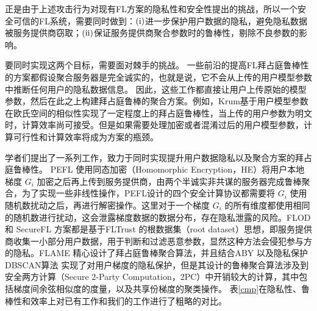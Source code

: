 正是由于上述攻击行为对现有FL方案的隐私性和安全性提出的挑战，所以一个安全可信的FL系统，需要同时做到：$(\rm \romannumeral1)$进一步保护用户数据的隐私，避免隐私数据被服务提供商窃取；$(\rm \romannumeral2)$保证服务提供商聚合参数时的鲁棒性，剔除不良参数的影响。

要同时实现这两个目标，需要面对棘手的挑战。
一些前沿的提高FL拜占庭鲁棒性的方案\cite{blanchard2017machine, guerraoui2018hidden, yin2018byzantine}都假设聚合服务器是完全诚实的，也就是说，它不会从上传的用户模型参数中推断任何用户的隐私数据信息。
因此，这些工作都直接让用户上传原始的模型参数，然后在此之上构建拜占庭鲁棒的聚合方案。例如，Krum\cite{blanchard2017machine}基于用户模型参数在欧氏空间的相似性实现了一定程度上的拜占庭鲁棒性，当上传的用户参数为明文时，计算效率尚可接受。但是如果需要处理加密或者混淆过后的用户模型参数，计算可行性和计算效率将成为方案的瓶颈。

学者们提出了一系列工作\cite{liu2021privacy, dong2021flod, nguyen2022flame, hao2021efficient, so2020byzantine}，致力于同时实现提升用户数据隐私以及聚合方案的拜占庭鲁棒性。
PEFL\cite{liu2021privacy} 使用同态加密（Homomorphic Encryption，HE）将用户本地梯度 $G_i$ 加密之后再上传到服务提供商，由两个半诚实非共谋的服务器完成鲁棒聚合，为了实现一些非线性操作，PEFL设计的四个安全计算协议都需要将 $G_i$ 使用随机数扰动之后，再进行解密操作。这里对于一个梯度 $G_i$ 的所有维度都使用相同的随机数进行扰动，这会泄露梯度数据的数据分布，存在隐私泄露的风险。FLOD \cite{dong2021flod} 和 SecureFL \cite{hao2021efficient} 方案都是基于FLTrust \cite{DBLP:conf/ndss/CaoF0G21} 的根数据集（root dataset）思想，即服务提供商收集一小部分用户数据，用于判断和过滤恶意参数，显然这种方法会侵犯参与方的隐私。FLAME \cite{nguyen2022flame} 精心设计了拜占庭鲁棒聚合算法，并且结合ABY\cite{demmler2015aby} 以及隐私保护DBSCAN算法 \cite{bozdemir2021privacy} 实现了对用户梯度的隐私保护，但是其设计的鲁棒聚合算法涉及到安全两方计算（Secure 2-Party Computation，2PC）中开销较大的计算，其中包括梯度间余弦相似度的度量，以及共享份梯度的聚类操作。
表\ref{cmp}在隐私性、鲁棒性和效率上对已有工作和我们的工作进行了粗略的对比。

